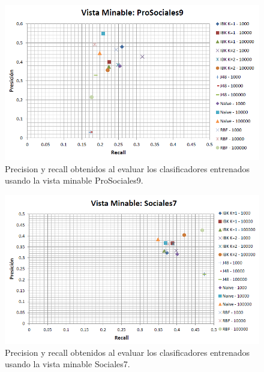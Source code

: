 \documentclass{article}
\begin{document}
\begin{figure}[!htb]
\begin{centering}
\includegraphics[scale=0.7]{prosociales9}
\par\end{centering}
\caption{Precision y recall obtenidos al evaluar los clasificadores entrenados usando la vista minable ProSociales9.}
\label{fig:figura19}
\end{figure}
\clearpage
\begin{figure}[!htb]
\begin{centering}
\includegraphics[scale=0.7]{sociales7}
\par\end{centering}
\caption{Precision y recall obtenidos al evaluar los clasificadores entrenados usando la vista minable Sociales7.}
\label{fig:figura20}
\end{figure}
\end{document}
